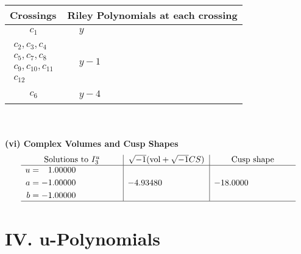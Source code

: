 \documentclass[1p]{elsarticle_modified}
\theoremstyle{definition}
\newcommand{\I}{\sqrt{-1}}
\begin{document}
\begin{tabular}{m{50pt}|m{274pt}}
Crossings & \hspace{64pt}Riley Polynomials at each crossing \\
\hline $$\begin{aligned}c_{1}\end{aligned}$$&$\begin{aligned}
&y
\end{aligned}$\\
\hline $$\begin{aligned}c_{2},c_{3},c_{4}\\c_{5},c_{7},c_{8}\\c_{9},c_{10},c_{11}\\c_{12}\end{aligned}$$&$\begin{aligned}
&y-1
\end{aligned}$\\
\hline $$\begin{aligned}c_{6}\end{aligned}$$&$\begin{aligned}
&y-4
\end{aligned}$\\
\hline
\end{tabular}\\~\\
\newpage\flushleft \textbf{(vi) Complex Volumes and Cusp Shapes}
$$\begin{array}{c|c|c}  
\text{Solutions to }I^u_{3}& \I (\text{vol} + \sqrt{-1}CS) & \text{Cusp shape}\\
 \hline 
\begin{aligned}
u &= \phantom{-}1.00000\phantom{ +0.000000I} \\
a &= -1.00000\phantom{ +0.000000I} \\
b &= -1.00000\phantom{ +0.000000I}\end{aligned}
 & -4.93480\phantom{ +0.000000I} & -18.0000\phantom{ +0.000000I}\\
 \hline 
 \end{array}$$\newpage
\newpage\renewcommand{\arraystretch}{1}
\centering \section*{ IV. u-Polynomials}
\end{document}
